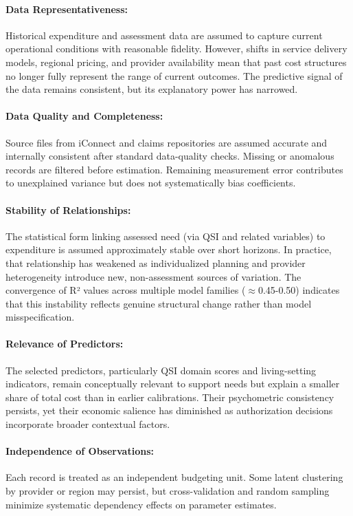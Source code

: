  
\paragraph{Data Representativeness:} Historical expenditure and assessment data are assumed to capture current operational conditions with reasonable fidelity.  However, shifts in service delivery models, regional pricing, and provider availability mean that past cost structures no longer fully represent the range of current outcomes.  The predictive signal of the data remains consistent, but its explanatory power has narrowed.
 
\paragraph{Data Quality and Completeness:} Source files from iConnect and claims repositories are assumed accurate and internally consistent after standard data-quality checks.  Missing or anomalous records are filtered before estimation.  Remaining measurement error contributes to unexplained variance but does not systematically bias coefficients. 
 
\paragraph{Stability of Relationships:} The statistical form linking assessed need (via QSI and related variables) to expenditure is assumed approximately stable over short horizons.  In practice, that relationship has weakened as individualized planning and provider heterogeneity introduce new, non-assessment sources of variation.  The convergence of R² values across multiple model families ($\approx$0.45-0.50) indicates that this instability reflects genuine structural change rather than model misspecification.
 
\paragraph{Relevance of Predictors:} The selected predictors, particularly QSI domain scores and living-setting indicators, remain conceptually relevant to support needs but explain a smaller share of total cost than in earlier calibrations.  Their psychometric consistency persists, yet their economic salience has diminished as authorization decisions incorporate broader contextual factors.
 
\paragraph{Independence of Observations:} Each record is treated as an independent budgeting unit.  Some latent clustering by provider or region may persist, but cross-validation and random sampling minimize systematic dependency effects on parameter estimates.
 
